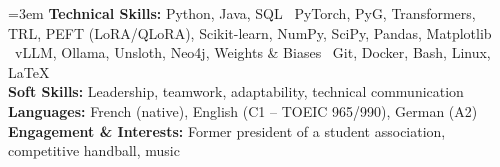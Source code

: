 \documentclass[a4paper,10pt]{article}
\begin{document}
\vspace{3pt}
\begingroup\emergencystretch=3em
\textbf{Technical Skills:} Python, Java, SQL \textbar\ PyTorch, PyG, Transformers, TRL, PEFT (LoRA/QLoRA), \mbox{Scikit-learn}, NumPy, SciPy, Pandas, Matplotlib \textbar\ vLLM, Ollama, Unsloth, Neo4j, Weights \& Biases \textbar\ Git, Docker, Bash, Linux, LaTeX\\
\textbf{Soft Skills:} Leadership, teamwork, adaptability, technical communication\\
\textbf{Languages:} French (native), English (C1 -- TOEIC 965/990), German (A2)\\
\textbf{Engagement \& Interests:} Former president of a student association, competitive handball, music\par\endgroup

\vfill
\end{document}
